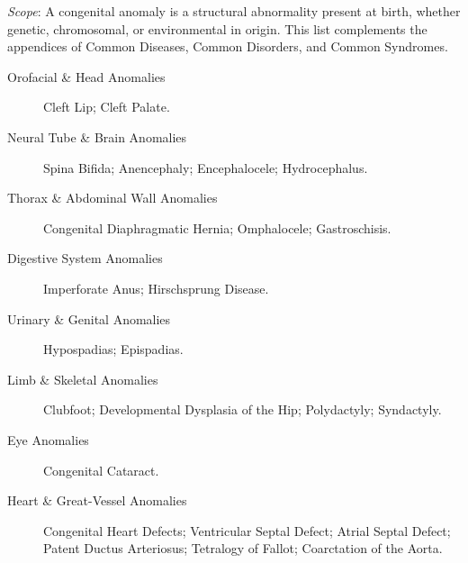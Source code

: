 \small
\noindent\textit{Scope}: A congenital anomaly is a structural abnormality present at birth, whether genetic, chromosomal, or environmental in origin. This list complements the appendices of Common Diseases, Common Disorders, and Common Syndromes.

\medskip
\begin{description}
\item[Orofacial \& Head Anomalies] Cleft Lip; Cleft Palate.

\item[Neural Tube \& Brain Anomalies] Spina Bifida; Anencephaly; Encephalocele; Hydrocephalus.

\item[Thorax \& Abdominal Wall Anomalies] Congenital Diaphragmatic Hernia; Omphalocele; Gastroschisis.

\item[Digestive System Anomalies] Imperforate Anus; Hirschsprung Disease.

\item[Urinary \& Genital Anomalies] Hypospadias; Epispadias.

\item[Limb \& Skeletal Anomalies] Clubfoot; Developmental Dysplasia of the Hip; Polydactyly; Syndactyly.

\item[Eye Anomalies] Congenital Cataract.

\item[Heart \& Great-Vessel Anomalies] Congenital Heart Defects; Ventricular Septal Defect; Atrial Septal Defect; Patent Ductus Arteriosus; Tetralogy of Fallot; Coarctation of the Aorta.
\end{description}